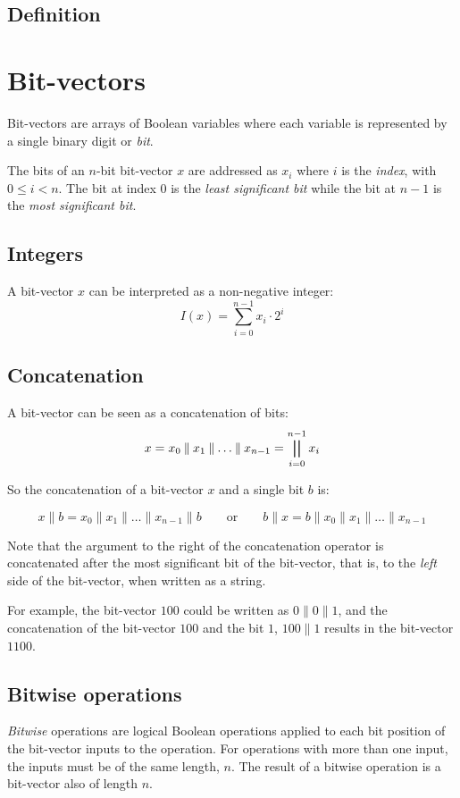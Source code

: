 \documentclass[a4paper,10pt,twoside,openright]{book}
\newcommand*\concat{\mathbin{\|}}
\begin{document}
\subsection{Definition}


\section{Bit-vectors}
Bit-vectors are arrays of Boolean variables where each variable is represented by a single binary digit or \textit{bit}. 

The bits of an $n$-bit bit-vector $x$ are addressed as $x_i$ where $i$ is the \textit{index}, with $0 \leq i < n$. 
The bit at index $0$ is the \textit{least significant bit} while the bit at $n-1$ is the \textit{most significant bit}.

\subsection{Integers}
A bit-vector $x$ can be interpreted as a non-negative integer: 
\[ I(x) = \sum_{i=0}^{n-1}x_i \cdot 2^i \]

\subsection{Concatenation}
A bit-vector can be seen as a concatenation of bits:
\[x = x_0 \concat x_1 \concat \ldots \concat x_{n-1} = \bigparallel_{i=0}^{n-1} x_i\]

So the concatenation of a bit-vector $x$ and a single bit $b$ is:

\[x \concat b = x_0 \concat x_1 \concat \ldots \concat x_{n-1} \concat b\qquad \text{or}\qquad b \concat x = b \concat x_0 \concat x_1 \concat \ldots \concat x_{n-1}\]

Note that the argument to the right of the concatenation operator is concatenated after the most significant bit of the bit-vector, that is, to the \textit{left} side of the bit-vector, when written as a string.

For example, the bit-vector $100$ could be written as $0 \concat 0 \concat 1$, and the concatenation of the bit-vector $100$ and the bit $1$, $100 \concat 1$ results in the bit-vector $1100$.

\subsection{Bitwise operations}
\textit{Bitwise} operations are logical Boolean operations applied to each bit position of the bit-vector inputs to the operation. For operations with more than one input, the inputs must be of the same length, $n$. The result of a bitwise operation is a bit-vector also of length $n$.
\end{document}
